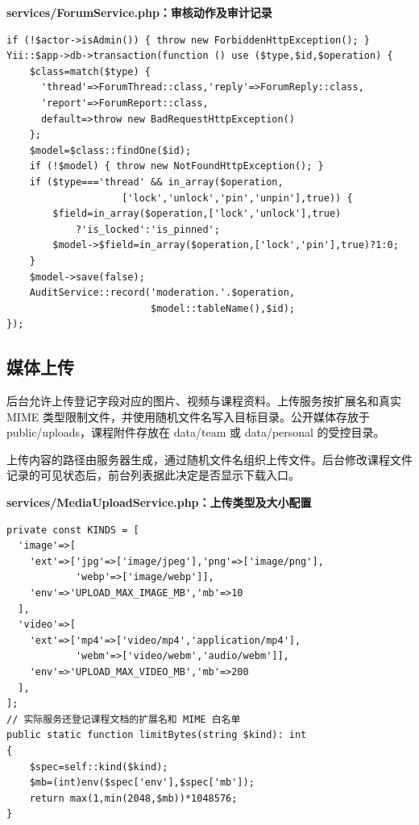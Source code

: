 \documentclass[UTF8,a4paper,11pt]{ctexart}
\begin{document}
\noindent\textbf{services/ForumService.php：审核动作及审计记录}\par\vspace{2pt}
\begin{lstlisting}
if (!$actor->isAdmin()) { throw new ForbiddenHttpException(); }
Yii::$app->db->transaction(function () use ($type,$id,$operation) {
    $class=match($type) {
      'thread'=>ForumThread::class,'reply'=>ForumReply::class,
      'report'=>ForumReport::class,
      default=>throw new BadRequestHttpException()
    };
    $model=$class::findOne($id);
    if (!$model) { throw new NotFoundHttpException(); }
    if ($type==='thread' && in_array($operation,
                    ['lock','unlock','pin','unpin'],true)) {
        $field=in_array($operation,['lock','unlock'],true)
            ?'is_locked':'is_pinned';
        $model->$field=in_array($operation,['lock','pin'],true)?1:0;
    }
    $model->save(false);
    AuditService::record('moderation.'.$operation,
                         $model::tableName(),$id);
});
\end{lstlisting}

\subsection{媒体上传}
后台允许上传登记字段对应的图片、视频与课程资料。上传服务按扩展名和真实 MIME 类型限制文件，并使用随机文件名写入目标目录。公开媒体存放于 public/uploads，课程附件存放在 data/team 或 data/personal 的受控目录。

上传内容的路径由服务器生成，通过随机文件名组织上传文件。后台修改课程文件记录的可见状态后，前台列表据此决定是否显示下载入口。


\noindent\textbf{services/MediaUploadService.php：上传类型及大小配置}\par\vspace{2pt}
\begin{lstlisting}
private const KINDS = [
  'image'=>[
    'ext'=>['jpg'=>['image/jpeg'],'png'=>['image/png'],
            'webp'=>['image/webp']],
    'env'=>'UPLOAD_MAX_IMAGE_MB','mb'=>10
  ],
  'video'=>[
    'ext'=>['mp4'=>['video/mp4','application/mp4'],
            'webm'=>['video/webm','audio/webm']],
    'env'=>'UPLOAD_MAX_VIDEO_MB','mb'=>200
  ],
];
// 实际服务还登记课程文档的扩展名和 MIME 白名单
public static function limitBytes(string $kind): int
{
    $spec=self::kind($kind);
    $mb=(int)env($spec['env'],$spec['mb']);
    return max(1,min(2048,$mb))*1048576;
}
\end{lstlisting}
\end{document}
